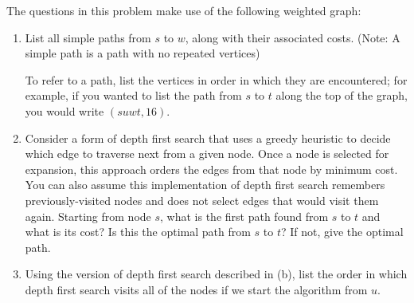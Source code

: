 \documentclass[9pt]{article}
\begin{document}
\vspace{5mm}

\item The questions in this problem make use of the following weighted graph:

\begin{center}
\end{center}

\begin{enumerate}
    \item List all simple paths from $s$ to $w$, along with their associated costs. (Note: A simple path is a path with no repeated vertices)
    
    To refer to a path, list the vertices in order in which they are encountered; for example, if you wanted to list the path from $s$ to $t$ along the top of the graph, you would write $(suwt, 16)$.
    
    \item Consider a form of depth first search that uses a greedy heuristic to decide which edge to traverse next from a given node. Once a node is selected for expansion, this approach orders the edges from that node by minimum cost. You can also assume this implementation of depth first search remembers previously-visited nodes and does not select edges that would visit them again. Starting from node $s$, what is the first path found from $s$ to $t$ and what is its cost? Is this the optimal path from $s$ to $t$? If not, give the optimal path.
    
    \item Using the version of depth first search described in (b), list the order in which depth first search visits all of the nodes if we start the algorithm from $u$.
    
\end{enumerate}
\end{document}
